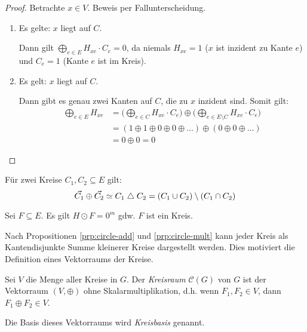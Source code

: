 \begin{proof}
    Betrachte $ x \in V $.
    Beweis per Fallunterscheidung.
    \begin{enumerate}
        \item Es gelte: $ x $ liegt auf $ C $.

        Dann gilt $ \bigoplus_{e \in E} H_{xe} \cdot C_e = 0 $, da niemals $ H_{xe} = 1 $ ($ x $ ist inzident zu Kante $ e $) und $ C_e = 1 $ (Kante $ e $ ist im Kreis).

        \item Es gelt: $ x $ liegt auf $ C $.

        Dann gibt es genau zwei Kanten auf $ C $, die zu $ x $ inzident sind.
        Somit gilt:
        \begin{align*}
            \bigoplus_{e \in E} H_{xe} &= \big(\bigoplus_{e \in C} H_{xe} \cdot C_e\big) \oplus \big(\bigoplus_{e \in E \setminus C} H_{xe} \cdot C_e\big) \\
            &= (1 \oplus 1 \oplus 0 \oplus 0 \oplus \dots) \oplus (0 \oplus 0 \oplus \dots) \\
            &= 0 \oplus 0 = 0
        \end{align*}
    \end{enumerate}
\end{proof}

\begin{proposition}
    \label{prp:circle-add}
    Für zwei Kreise $ C_1, C_2 \subseteq E $ gilt:
    \begin{equation*}
        \vec{C_1} \oplus \vec{C_2} \simeq C_1 \mathrel{\triangle} C_2 = (C_1 \cup C_2) \setminus (C_1 \cap C_2)
    \end{equation*}
\end{proposition}

\begin{proposition}
    \label{prp:circle-mult}
    Sei $ F \subseteq E $.
    Es gilt $ H \odot F = 0^m $ gdw. $ F $ ist ein Kreis.
\end{proposition}

\begin{remark}
    Nach Propositionen \ref{prp:circle-add} und \ref{prp:circle-mult} kann jeder Kreis als Kantendisjunkte Summe kleinerer Kreise dargestellt werden.
    Dies motiviert die Definition eines Vektorraums der Kreise.
\end{remark}

\begin{definition}[Kreisraum]
    Sei $ V $ die Menge aller Kreise in $ G $.
    Der \textit{Kreisraum} $ \mathcal{C}(G) $ von $ G $ ist der Vektorraum $ (V, \oplus) $ ohne Skalarmultiplikation, d.h. wenn $ F_1, F_2 \in V $, dann $ F_1 \oplus F_2 \in V $.

    Die Basis dieses Vektorraums wird \textit{Kreisbasis} genannt.
\end{definition}

